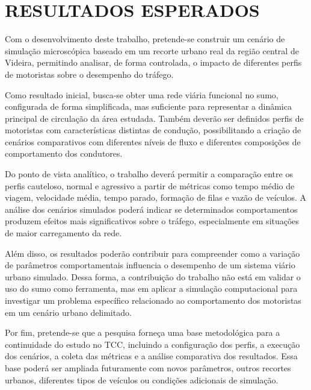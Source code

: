 \chapter{RESULTADOS ESPERADOS}

Com o desenvolvimento deste trabalho, pretende-se construir um cenário de simulação microscópica baseado em um recorte urbano real da região central de Videira, permitindo analisar, de forma controlada, o impacto de diferentes perfis de motoristas sobre o desempenho do tráfego.

Como resultado inicial, busca-se obter uma rede viária funcional no \gls{sumo}, configurada de forma simplificada, mas suficiente para representar a dinâmica principal de circulação da área estudada. Também deverão ser definidos perfis de motoristas com características distintas de condução, possibilitando a criação de cenários comparativos com diferentes níveis de fluxo e diferentes composições de comportamento dos condutores.

Do ponto de vista analítico, o trabalho deverá permitir a comparação entre os perfis cauteloso, normal e agressivo a partir de métricas como tempo médio de viagem, velocidade média, tempo parado, formação de filas e vazão de veículos. A análise dos cenários simulados poderá indicar se determinados comportamentos produzem efeitos mais significativos sobre o tráfego, especialmente em situações de maior carregamento da rede.

Além disso, os resultados poderão contribuir para compreender como a variação de parâmetros comportamentais influencia o desempenho de um sistema viário urbano simulado. Dessa forma, a contribuição do trabalho não está em validar o uso do \gls{sumo} como ferramenta, mas em aplicar a simulação computacional para investigar um problema específico relacionado ao comportamento dos motoristas em um cenário urbano delimitado.

Por fim, pretende-se que a pesquisa forneça uma base metodológica para a continuidade do estudo no TCC, incluindo a configuração dos perfis, a execução dos cenários, a coleta das métricas e a análise comparativa dos resultados. Essa base poderá ser ampliada futuramente com novos parâmetros, outros recortes urbanos, diferentes tipos de veículos ou condições adicionais de simulação.

